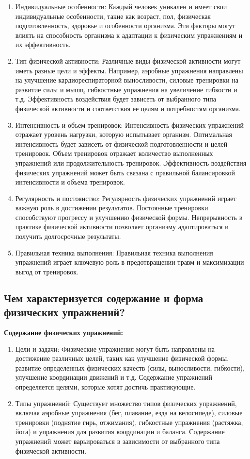 \begin{enumerate}
    \item Индивидуальные особенности: Каждый человек уникален и имеет свои индивидуальные особенности, такие как возраст, пол, физическая подготовленность, здоровье и особенности организма. Эти факторы могут влиять на способность организма к адаптации к физическим упражнениям и их эффективность.
    \item Тип физической активности: Различные виды физической активности могут иметь разные цели и эффекты. Например, аэробные упражнения направлены на улучшение кардиореспираторной выносливости, силовые тренировки на развитие силы и мышц, гибкостные упражнения на увеличение гибкости и т.д. Эффективность воздействия будет зависеть от выбранного типа физической активности и соответствия ее целям и потребностям организма.
    \item Интенсивность и объем тренировок: Интенсивность физических упражнений отражает уровень нагрузки, которую испытывает организм. Оптимальная интенсивность будет зависеть от физической подготовленности и целей тренировок. Объем тренировок отражает количество выполненных упражнений или продолжительность тренировок. Эффективность воздействия физических упражнений может быть связана с правильной балансировкой интенсивности и объема тренировок.
    \item Регулярность и постоянство: Регулярность физических упражнений играет важную роль в достижении результатов. Постоянные тренировки способствуют прогрессу и улучшению физической формы. Непрерывность в практике физической активности позволяет организму адаптироваться и получить долгосрочные результаты.
    \item Правильная техника выполнения: Правильная техника выполнения упражнений играет ключевую роль в предотвращении травм и максимизации выгод от тренировок.
\end{enumerate}

\subsection{Чем характеризуется содержание и форма физических упражнений?}

\textbf{Содержание физических упражнений:}
\begin{enumerate}
    \item Цели и задачи: Физические упражнения могут быть направлены на достижение различных целей, таких как улучшение физической формы, развитие определенных физических качеств (силы, выносливости, гибкости), улучшение координации движений и т.д. Содержание упражнений определяется целями, которые хотят достичь практикующие.
    \item Типы упражнений: Существует множество типов физических упражнений, включая аэробные упражнения (бег, плавание, езда на велосипеде), силовые тренировки (поднятие гирь, отжимания), гибкостные упражнения (растяжка, йога) и упражнения для развития координации и баланса. Содержание упражнений может варьироваться в зависимости от выбранного типа физической активности.
\end{enumerate}

